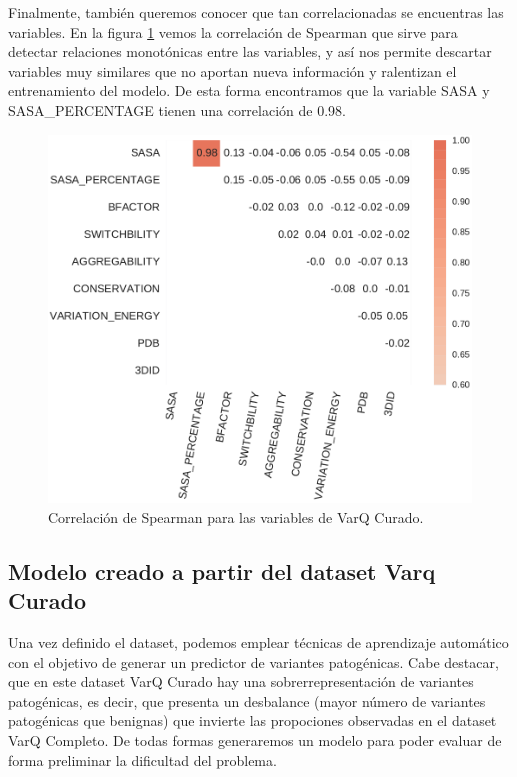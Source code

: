 Finalmente, también queremos conocer que tan correlacionadas se encuentras las variables. En la figura \ref{fig:varq_corrplot} vemos la correlación de Spearman que sirve para detectar relaciones monotónicas entre las variables, y así nos permite descartar variables muy similares que no aportan nueva información y ralentizan el entrenamiento del modelo. De esta forma encontramos que la variable SASA y SASA\_PERCENTAGE tienen una correlación de 0.98.

\begin{figure}[H]
    \centering
    \includegraphics[scale=0.6]{documents/latex/figures/3/varq/varq_corrplot.pdf}
    \caption{Correlación de Spearman para las variables de VarQ Curado.}
    \label{fig:varq_corrplot}
\end{figure}

\pagebreak

\subsection{Modelo creado a partir del dataset Varq Curado}

Una vez definido el dataset, podemos emplear técnicas de aprendizaje automático con el objetivo de generar un predictor de variantes patogénicas. Cabe destacar, que en este dataset VarQ Curado hay una sobrerrepresentación de variantes patogénicas, es decir, que presenta un desbalance (mayor número de variantes patogénicas que benignas) que invierte las propociones observadas en el dataset VarQ Completo. De todas formas generaremos un modelo para poder evaluar de forma preliminar la dificultad del problema. 

